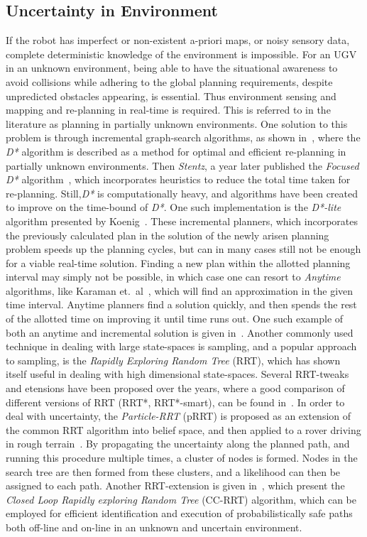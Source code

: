\subsection{Uncertainty in Environment}
If the robot has imperfect or non-existent a-priori maps, or noisy sensory data,
complete deterministic knowledge of the environment is impossible. For an UGV in
an unknown environment, being able to have the situational awareness to avoid
collisions while adhering to the global planning requirements, despite
unpredicted obstacles appearing, is essential. Thus environment sensing and
mapping and re-planning in real-time is required. This is referred to in the
literature as planning in partially unknown environments. One solution to this
problem is through incremental graph-search algorithms, as shown
in~\cite{stentzOptimalEfficientPath}, where the \textsl{D*} algorithm is
described as a method for optimal and efficient re-planning in partially unknown
environments. Then \textit{Stentz}, a year later published the \textit{Focused
  D*} algorithm~\cite{stentz1995focussed}, which incorporates heuristics to
reduce the total time taken for re-planning. Still,\textit{D*} is
computationally heavy, and algorithms have been created to improve on the
time-bound of \textit{D*}. One such implementation is the \textit{D*-lite}
algorithm presented by Koenig~\cite{koenig2002d}. These incremental planners,
which incorporates the previously calculated plan in the solution of the newly
arisen planning problem speeds up the planning cycles, but can in many cases
still not be enough for a viable real-time solution. Finding a new plan within
the allotted planning interval may simply not be possible, in which case one can
resort to \textit{Anytime} algorithms, like Karaman et.\
al~\cite{karamanAnytimeMotionPlanning2011}, which will find an approximation in
the given time interval. Anytime planners find a solution quickly, and then
spends the rest of the allotted time on improving it until time runs out. One
such example of both an anytime and incremental solution is given
in~\cite{likhachevAnytimeSearchDynamic2008}. Another commonly used technique in
dealing with large state-spaces is sampling, and a popular approach to sampling,
is the \textit{Rapidly Exploring Random Tree} (RRT), which has shown itself
useful in dealing with high dimensional state-spaces. Several RRT-tweaks and
etensions have been proposed over the years, where a good comparison of
different versions of RRT (RRT*, RRT*-smart), can be found
in~\cite{noreenComparisonRRTRRT2016}. In order to deal with uncertainty, the
\textit{Particle-RRT} (pRRT) is proposed as an extension of the common RRT
algorithm into belief space, and then applied to a rover driving in rough
terrain~\cite{melchiorParticleRRTPath2007}. By propagating the uncertainty along
the planned path, and running this procedure multiple times, a cluster of nodes
is formed. Nodes in the search tree are then formed from these clusters, and a
likelihood can then be assigned to each path. Another RRT-extension is given
in~\cite{Luders_2013}, which present the \textit{Closed Loop Rapidly exploring
  Random Tree} (CC-RRT) algorithm, which can be employed for efficient
identification and execution of probabilistically safe paths both off-line and
on-line in an unknown and uncertain environment.

